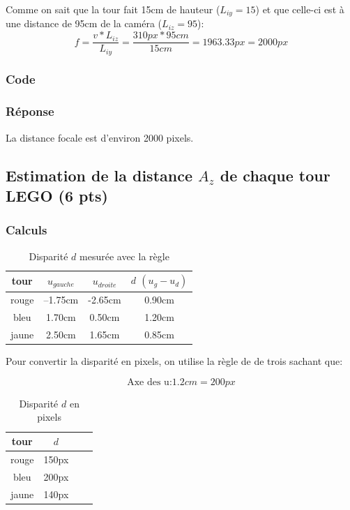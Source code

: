 \documentclass[12pt]{article}
\begin{document}
Comme on sait que la tour fait 15cm de hauteur ($L_{iy} = 15$) et que celle-ci est \`a une distance de 95cm de la cam\'era ($L_{iz} = 95$):
\[
    f =  \frac{v * L_{iz}}{L_{iy}} = \frac{310px * 95 cm}{15cm} = 1963.33 px = 2000 px
\]


\subsubsection{Code}
\subsubsection{Réponse}
La distance focale est d'environ 2000 pixels.

\subsection{Estimation de la distance $A_z$ de chaque tour LEGO (6 pts)}
\label{estimation_distance_Az}
\subsubsection{Calculs}

\begin{table}[h]
\caption{Disparit\'e $d$ mesur\'ee avec la r\`egle}
\label{TableCoord}
\begin{center}
\begin{tabular}{|c|c|c|c|}
\hline
    tour   &  $u_{gauche}$  &  $u_{droite}$  &  $d$ $(u_g - u_d)$ \\
\hline
    rouge  & --1.75cm & -2.65cm & 0.90cm \\
    bleu   & 1.70cm & 0.50cm & 1.20cm \\
    jaune  & 2.50cm & 1.65cm & 0.85cm \\
\hline
\end{tabular}
\end{center}
\end{table}

Pour convertir la disparit\'e en pixels, on utilise la r\`egle de de trois sachant que:

\[ \text{Axe des u:} 1.2cm = 200px \]


\begin{table}[h]
\caption{Disparit\'e $d$ en pixels}
\label{TableCoord}
\begin{center}
\begin{tabular}{|c|c|c|c|}
\hline
    tour   &  $d$ \\
\hline
    rouge  &  150px \\
    bleu   &  200px \\
    jaune  &  140px \\
\hline
\end{tabular}
\end{center}
\end{table}
\end{document}
